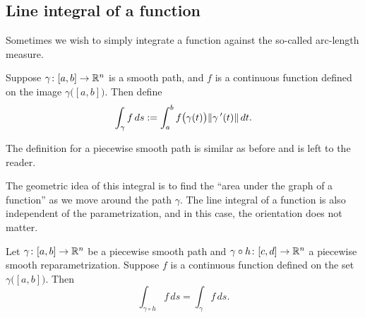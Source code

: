 

\subsection{Line integral of a function}

Sometimes we wish to simply integrate a function against the so-called
arc-length measure.

\begin{defn}
Suppose $\gamma \colon [a,b] \to {\mathbb{R}}^n$ is a smooth path, and $f$ is a
continuous function defined on the image $\gamma\bigl([a,b]\bigr)$.  Then
define
\begin{equation*}
\int_{\gamma} f \,ds :=
\int_a^b f\bigl( \gamma(t) \bigr) \lVert {\gamma^{\:\prime}(t)} \rVert \, dt .
\end{equation*}

The definition for a piecewise smooth path is similar as before and is left
to the reader.
\end{defn}

The geometric idea of this integral is to find the ``area under the
graph of a function'' as we move around the path $\gamma$.
The line integral of a function is also independent of the parametrization,
and in this case, the orientation does not matter.

\begin{prop} \label{mv:prop:lineintrepararam}
Let $\gamma \colon [a,b] \to {\mathbb{R}}^n$ be a piecewise smooth path and
$\gamma \circ h \colon [c,d] \to {\mathbb{R}}^n$ a piecewise smooth reparametrization.
Suppose $f$ is a continuous function defined on the set
$\gamma\bigl([a,b]\bigr)$.  Then
\begin{equation*}
\int_{\gamma \circ h} f\, ds = \int_{\gamma} f\, ds .
\end{equation*}
\end{prop}

